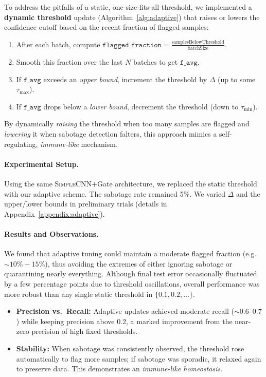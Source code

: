 \documentclass[12pt]{article}
\begin{document}
To address the pitfalls of a static, one-size-fits-all threshold, we implemented
a \textbf{dynamic threshold} update (Algorithm~\ref{alg:adaptive}) that raises or
lowers the confidence cutoff based on the recent fraction of flagged samples:
\begin{enumerate}
  \item After each batch, compute \(\texttt{flagged\_fraction} = \frac{\text{samplesBelowThreshold}}{\text{batchSize}}\).
  \item Smooth this fraction over the last $N$ batches to get \(\texttt{f\_avg}\).
  \item If \(\texttt{f\_avg}\) exceeds an \emph{upper bound}, increment the threshold
        by \(\Delta\) (up to some \(\tau_{\max}\)).
  \item If \(\texttt{f\_avg}\) drops below a \emph{lower bound}, decrement the threshold
        (down to \(\tau_{\min}\)).
\end{enumerate}
By dynamically \emph{raising} the threshold when too many samples are flagged
and \emph{lowering} it when sabotage detection falters, this approach mimics
a self-regulating, \emph{immune-like} mechanism.

\paragraph{Experimental Setup.}
Using the same \textsc{SimpleCNN}+Gate architecture, we replaced the static threshold
with our adaptive scheme. The sabotage rate remained 5\%. We varied \(\Delta\)
and the upper/lower bounds in preliminary trials (details in Appendix~\ref{appendix:adaptive}).

\paragraph{Results and Observations.}
We found that adaptive tuning could maintain a moderate flagged fraction
(e.g.\ $\sim 10\%-15\%$), thus avoiding the extremes of either ignoring sabotage
or quarantining nearly everything. Although final test error occasionally
fluctuated by a few percentage points due to threshold oscillations, overall
performance was more robust than any single static threshold in $\{0.1,0.2,\dots\}$.

\begin{itemize}
  \item \textbf{Precision vs.\ Recall:}
    Adaptive updates achieved moderate recall ($\sim0.6$--$0.7$) while keeping
    precision above $0.2$, a marked improvement from the near-zero precision
    of high fixed thresholds.
  \item \textbf{Stability:}
    When sabotage was consistently observed, the threshold rose automatically
    to flag more samples; if sabotage was sporadic, it relaxed again to preserve
    data. This demonstrates an \emph{immune-like homeostasis}.
\end{itemize}
\end{document}
